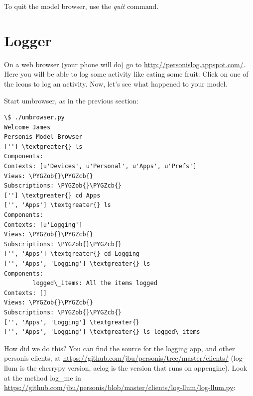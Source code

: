 \documentclass[letterpaper,10pt,english]{sphinxmanual}
\def\PYGZob{\char`\{}
\def\PYGZcb{\char`\}}
\begin{document}
To quit the model browser, use the \emph{quit} command.


\section{Logger}
\label{Tutorial:logger}
On a web browser (your phone will do) go to \href{http://personislog.appspot.com/}{http://personislog.appspot.com/}. Here you will be able to log some activity like eating some fruit. Click on one of the icons to log an activity. Now, let's see what happened to your model.

Start umbrowser, as in the previous section:

\begin{Verbatim}[commandchars=\\\{\}]
\$ ./umbrowser.py
Welcome James
Personis Model Browser
[''] \textgreater{} ls
Components:
Contexts: [u'Devices', u'Personal', u'Apps', u'Prefs']
Views: \PYGZob{}\PYGZcb{}
Subscriptions: \PYGZob{}\PYGZcb{}
[''] \textgreater{} cd Apps
['', 'Apps'] \textgreater{} ls
Components:
Contexts: [u'Logging']
Views: \PYGZob{}\PYGZcb{}
Subscriptions: \PYGZob{}\PYGZcb{}
['', 'Apps'] \textgreater{} cd Logging
['', 'Apps', 'Logging'] \textgreater{} ls
Components:
        logged\_items: All the items logged
Contexts: []
Views: \PYGZob{}\PYGZcb{}
Subscriptions: \PYGZob{}\PYGZcb{}
['', 'Apps', 'Logging'] \textgreater{}
['', 'Apps', 'Logging'] \textgreater{} ls logged\_items
\end{Verbatim}

How did we do this? You can find the source for the logging app, and other personis clients, at \href{https://github.com/jbu/personis/tree/master/clients/}{https://github.com/jbu/personis/tree/master/clients/} (log-llum is the cherrypy version, aelog is the version that runs on appengine). Look at the method log\_me in \href{https://github.com/jbu/personis/blob/master/clients/log-llum/log-llum.py}{https://github.com/jbu/personis/blob/master/clients/log-llum/log-llum.py}:
\end{document}
